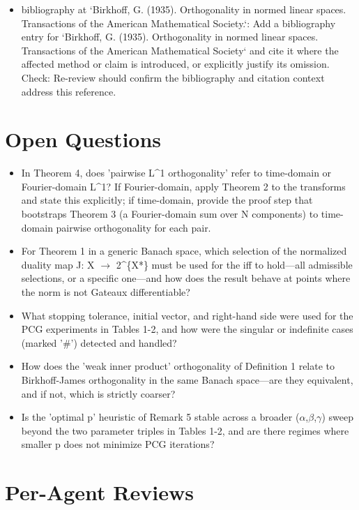 \documentclass[11pt]{article}
\begin{document}
\begin{itemize}[leftmargin=*]
  \item [open] bibliography at `Birkhoff, G. (1935). Orthogonality in normed linear spaces. Transactions of the American Mathematical Society.`: Add a bibliography entry for `Birkhoff, G. (1935). Orthogonality in normed linear spaces. Transactions of the American Mathematical Society` and cite it where the affected method or claim is introduced, or explicitly justify its omission. Check: Re-review should confirm the bibliography and citation context address this reference.
\end{itemize}

\section*{Open Questions}
\begin{itemize}[leftmargin=*]
  \item In Theorem 4, does 'pairwise L\^{}1 orthogonality' refer to time-domain or Fourier-domain L\^{}1? If Fourier-domain, apply Theorem 2 to the transforms and state this explicitly; if time-domain, provide the proof step that bootstraps Theorem 3 (a Fourier-domain sum over N components) to time-domain pairwise orthogonality for each pair.
  \item For Theorem 1 in a generic Banach space, which selection of the normalized duality map J: X \ensuremath{\to} 2\^{}\{X*\} must be used for the iff to hold---all admissible selections, or a specific one---and how does the result behave at points where the norm is not Gateaux differentiable?
  \item What stopping tolerance, initial vector, and right-hand side were used for the PCG experiments in Tables 1-2, and how were the singular or indefinite cases (marked '\#') detected and handled?
  \item How does the 'weak inner product' orthogonality of Definition 1 relate to Birkhoff-James orthogonality in the same Banach space---are they equivalent, and if not, which is strictly coarser?
  \item Is the 'optimal p' heuristic of Remark 5 stable across a broader (\ensuremath{\alpha},\ensuremath{\beta},\ensuremath{\gamma}) sweep beyond the two parameter triples in Tables 1-2, and are there regimes where smaller p does not minimize PCG iterations?
\end{itemize}

\section*{Per-Agent Reviews}
\end{document}
